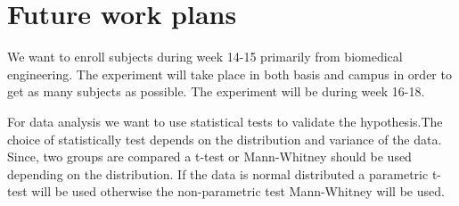 \chapter{Future work plans}
We want to enroll subjects during week 14-15 primarily from biomedical engineering. The experiment will take place in both basis and campus in order to get as many subjects as possible. The experiment will be during week 16-18.

For data analysis we want to use statistical tests to validate the hypothesis.The choice of statistically test depends on the distribution and variance of the data. Since, two groups are compared a t-test or Mann-Whitney should be used depending on the distribution. If the data is normal distributed a parametric t-test will be used otherwise the non-parametric test Mann-Whitney will be used.  
